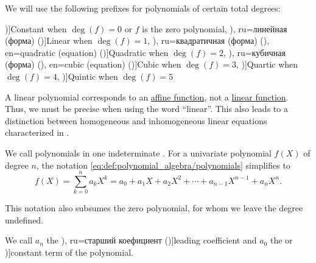 \begin{definition}\label{def:polynomial_degree_terminology}
  We will use the following prefixes for polynomials of certain total degrees:
  \begin{thmenum}
     \term[ru=константа (\cite[118]{Тыртышников2007ЛинейнаяАлгебра})]{Constant} when \( \deg(f) = 0 \) or \( f \) is the zero polynomial,
     \term[bg=линейна (функция) (\cite[1]{Обрешков1962ВисшаАлгебра}), ru=линейная (форма) (\cite[315]{Курош1968КурсВысшейАлгебры})]{Linear} when \( \deg(f) = 1 \),
     \term[bg=квадратна (функция) (\cite[1]{Обрешков1962ВисшаАлгебра}), ru=квадратичная (форма) (\cite[315]{Курош1968КурсВысшейАлгебры}), en=quadratic (equation) (\cite[360]{RosenEtAl2018DiscreteMathematicsHandbook})]{Quadratic} when \( \deg(f) = 2 \),
     \term[bg=кубична (форма) (\cite[1]{Обрешков1962ВисшаАлгебра}), ru=кубичная (форма) (\cite[315]{Курош1968КурсВысшейАлгебры}), en=cubic (equation) (\cite[360]{RosenEtAl2018DiscreteMathematicsHandbook})]{Cubic} when \( \deg(f) = 3 \),
     \term[en=quartic (equation) (\cite[360]{RosenEtAl2018DiscreteMathematicsHandbook})]{Quartic} when \( \deg(f) = 4 \),
     \term[en=quintic (equation) (\cite[360]{RosenEtAl2018DiscreteMathematicsHandbook})]{Quintic} when \( \deg(f) = 5 \)
  \end{thmenum}
\end{definition}
\begin{comments}
  \item A linear polynomial corresponds to an \hyperref[def:affine_operator]{affine function}, not a \hyperref[def:linear_function]{linear function}. Thus, we must be precise when using the word \enquote{linear}. This also leads to a distinction between homogeneous and inhomogeneous linear equations characterized in .
\end{comments}

\begin{definition}\label{def:univariate_polynomial}\mimprovised
  We call polynomials in one indeterminate . For a univariate polynomial \( f(X) \) of degree \( n \), the notation \eqref{eq:def:polynomial_algebra/polynomials} simplifies to
  \begin{equation}\label{eq:def:univariate_polynomial}
    f(X) = \sum_{k=0}^n a_k X^k = a_0 + a_1 X + a_2 X^2 + \cdots + a_{n-1} X^{n-1} + a_n X^n.
  \end{equation}

  This notation also subsumes the zero polynomial, for whom we leave the degree undefined.

  We call \( a_n \) the \term[bg=старши коефициент (\cite[23]{ГеновМиховскиМоллов1991Алгебра}), ru=старший коефициент (\cite[118]{Тыртышников2007ЛинейнаяАлгебра})]{leading coefficient} and \( a_0 \) the  or \term[ru=свободный член (\cite[118]{Тыртышников2007ЛинейнаяАлгебра})]{constant term} of the polynomial.
\end{definition}

